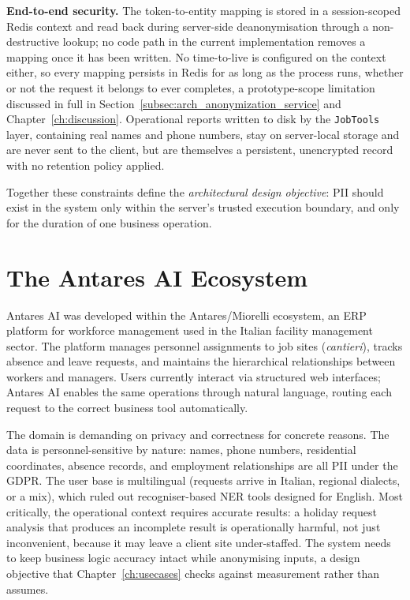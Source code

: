 \textbf{End-to-end security.} The token-to-entity mapping is stored in a session-scoped Redis context and read back during server-side deanonymisation through a non-destructive lookup; no code path in the current implementation removes a mapping once it has been written. No time-to-live is configured on the context either, so every mapping persists in Redis for as long as the process runs, whether or not the request it belongs to ever completes, a prototype-scope limitation discussed in full in Section~\ref{subsec:arch_anonymization_service} and Chapter~\ref{ch:discussion}. Operational reports written to disk by the \texttt{JobTools} layer, containing real names and phone numbers, stay on server-local storage and are never sent to the client, but are themselves a persistent, unencrypted record with no retention policy applied.

Together these constraints define the \emph{architectural design objective}: PII should exist in the system only within the server's trusted execution boundary, and only for the duration of one business operation.

\section{The Antares AI Ecosystem}
\label{sec:arch_antares_ecosystem}

Antares AI was developed within the Antares/Miorelli ecosystem, an ERP platform for workforce management used in the Italian facility management sector. The platform manages personnel assignments to job sites (\emph{cantieri}), tracks absence and leave requests, and maintains the hierarchical relationships between workers and managers. Users currently interact via structured web interfaces; Antares AI enables the same operations through natural language, routing each request to the correct business tool automatically.

The domain is demanding on privacy and correctness for concrete reasons. The data is personnel-sensitive by nature: names, phone numbers, residential coordinates, absence records, and employment relationships are all PII under the GDPR. The user base is multilingual (requests arrive in Italian, regional dialects, or a mix), which ruled out recogniser-based NER tools designed for English. Most critically, the operational context requires accurate results: a holiday request analysis that produces an incomplete result is operationally harmful, not just inconvenient, because it may leave a client site under-staffed. The system needs to keep business logic accuracy intact while anonymising inputs, a design objective that Chapter~\ref{ch:usecases} checks against measurement rather than assumes.

